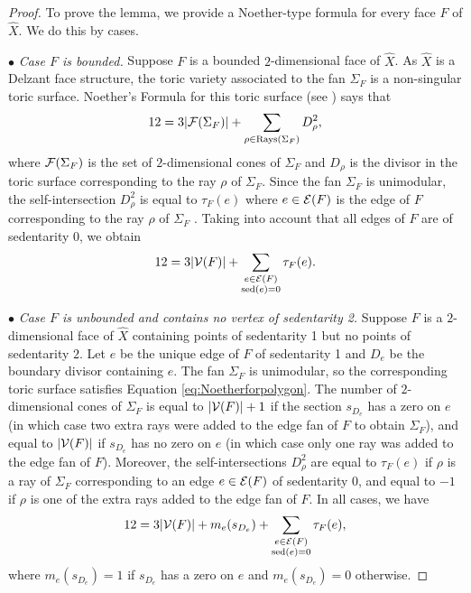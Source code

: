 \begin{proof}
To prove the lemma, we provide a Noether-type formula for every face $F$ of $\hat X$.
We do this by cases.

$\bullet$ {\em Case $F$ is bounded.} Suppose $F$ is a bounded $2$-dimensional face of $\hat X$. 
As $\hat X$ is a Delzant face structure, the toric variety associated to the fan 
$\Sigma_F$ is a non-singular toric surface. 
Noether's Formula for this toric surface (see \cite[Section 2.5]{Fulton}) says that
\begin{equation}\label{eq:Noetherforpolygon}
12 =  3 |{{\mathcal F}}(\Sigma_F)|  +  \sum_{\rho \in {\rm Rays}(\Sigma_F)} D_\rho^2,
\end{equation}
where ${{\mathcal F}}(\Sigma_F)$ is the set of $2$-dimensional cones of $\Sigma_F$ and  $D_{\rho}$ is the divisor in the toric surface corresponding to the ray $\rho$ of $\Sigma_F$.  
Since the fan $\Sigma_F$ is unimodular, the self-intersection $D_{\rho}^2$ is equal to $\tau_F(e)$ where $e \in {{\mathcal E}}(F)$ is the edge of $F$ corresponding to the ray $\rho$ of $\Sigma_F$ \cite[Section 2.5]{Fulton}. 
Taking into account that all edges of $F$ are of sedentarity $0$, we obtain
\begin{equation*}\label{eq:noethersed0}
12 = 3 |{{\mathcal V}}(F)|  + \sum_{\substack{e \in {{\mathcal E}}(F)\\ \operatorname{sed}(e)=0}} \tau_F(e).
\end{equation*}

$\bullet$ {\em Case $F$ is unbounded and contains no vertex of sedentarity 2.} Suppose $F$ is a $2$-dimensional face of $\hat X$ containing points of sedentarity 1 but no points of sedentarity $2$. 
Let $e$ be the unique edge of $F$ of sedentarity 1 and $D_e$ be the boundary divisor containing $e$.
The fan $\Sigma_F$ is unimodular, so the corresponding toric surface satisfies Equation \eqref{eq:Noetherforpolygon}. 
The number of $2$-dimensional cones of $\Sigma_F$ is equal to
$|{\mathcal V}(F)| + 1$ if the section $s_{D_e}$ has a zero on $e$ 
(in which case two extra rays were added to the edge fan of $F$ to obtain $\Sigma_F$), 
and equal to $|{\mathcal V}(F)|$ if $s_{D_e}$ has no zero on $e$ (in which case only one ray was added to the edge fan of $F$).
Moreover, the self-intersections $D_{\rho}^2$ are equal to $\tau_F(e)$ if $\rho$ is a ray of $\Sigma_F$ corresponding to an edge $e \in {{\mathcal E}}(F)$ of sedentarity 0, and equal to $-1$ if $\rho$ is one of the extra rays added to the edge fan of $F$.
In all cases, we have
\begin{equation*}\label{eq:noethersed1}
12 = 3 |{{\mathcal V}}(F)| + m_e(s_{D_e}) + \sum_{\substack{e \in {{\mathcal E}}(F)\\ \operatorname{sed}(e)=0}} \tau_F(e),
\end{equation*}
where $m_e(s_{D_e}) = 1$ if $s_{D_e}$ has a zero on $e$ and $m_e(s_{D_e}) = 0$ otherwise.


\end{proof}
